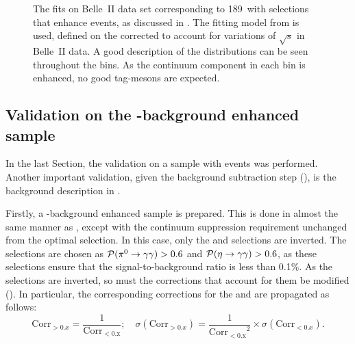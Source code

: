 \begin{figure}[hbtp!]
{    }
    \caption{\label{fig:mbc_qqbar_ehnhanced_fits}The fits on Belle~II data set corresponding to 189~\invfb with selections that enhance \epem\ra\qqbar events, as discussed in .
    The fitting model from  is used, defined on the corrected \Mbc to account for variations of $\sqrt{s}$ in Belle~II data.
    A good description of the \Mbc distributions can be seen throughout the \EB bins.
    As the continuum component in each \EB bin is enhanced, no good tag-\B mesons are expected.
    }
\end{figure}

\subsection{Validation on the \texorpdfstring{\BB}{BB}-background enhanced sample}\label{sec:bb_background_validation}

In the last Section, the validation on a sample with \epem\ra\qqbar events was performed.
Another important validation, given the background subtraction step (),
is the \BB background description in \MC.

Firstly, a \BB-background enhanced sample is prepared.
This is done in almost the same manner as , except with the continuum suppression requirement unchanged from the optimal selection.
In this case, only the \piVeto and \etaVeto selections are inverted.
The selections are chosen as ${\mathcal{P}(\pi^0\rightarrow\gamma\gamma)}>0.6$ and ${\mathcal{P}(\eta\rightarrow\gamma\gamma)}>0.6$, as these selections ensure that the signal-to-background ratio is less than 0.1\%.
As the selections are inverted, so must the corrections that account for them be modified ().
In particular, the corresponding corrections for the \piVeto and \etaVeto are propagated as follows:
\begin{equation}\label{eq:correction_transform}
    \mathrm{Corr}_{>0.x} = \frac{1}{\mathrm{Corr_{<0.x}}}; \quad \sigma(\mathrm{Corr}_{>0.x}) =  \frac{1}{\mathrm{Corr_{<0.x}}^2} \times \sigma(\mathrm{Corr}_{<0.x}).
\end{equation}

